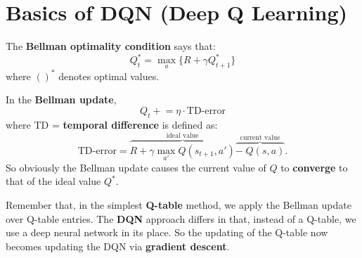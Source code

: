 \section{Basics of DQN (Deep Q Learning)}

The \textbf{Bellman optimality condition} says that:
\begin{equation}
	Q^*_t = \max_{a} \{ R + \gamma Q^*_{t+1} \}
\end{equation}
where $()^*$ denotes optimal values.

In the \textbf{Bellman update},
\begin{equation}
	Q_t \mathrel{+}= \eta \cdot \mbox{TD-error}
\end{equation}
where TD = \textbf{temporal difference} is defined as:
\begin{equation}
	\mbox{TD-error} = \overbrace{R + \gamma \max_{a'} Q(s_{t+1},a')}^{\mbox{ideal value}} \overbrace{ - \; Q(s,a)}^{\mbox{current value}} .
\end{equation}
So obviously the Bellman update causes the current value of $Q$ to \textbf{converge} to that of the ideal value $Q^*$.

Remember that, in the simplest \textbf{Q-table} method, we apply the Bellman update over Q-table entries.  The \textbf{DQN} approach differs in that, instead of a Q-table, we use a deep neural network in its place.  So the updating of the Q-table now becomes updating the DQN via \textbf{gradient descent}.
